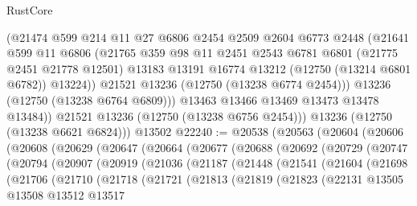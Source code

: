 \begin{lexlean}{RustCore}
\begin{coremodule}
              (@21474
                @599
                @214
                @11
                @27
                @6806
                @2454
                @2509
                @2604
                @6773
                @2448
                (@21641
                  @599
                  @11
                  @6806
                  (@21765
                    @359
                    @98
                    @11
                    @2451
                    @2543
                    @6781
                    @6801
                    (@21775 @2451 @21778 @12501)
                    @13183
                    @13191
                    @16774
                    @13212
                    (@12750 (@13214 @6801 @6782))
                    @13224))
                @21521
                @13236
                (@12750 (@13238 @6774 @2454)))
              @13236
              (@12750 (@13238 @6764 @6809)))
            @13463
            @13466
            @13469
            @13473
            @13478
            @13484))
        @21521
        @13236
        (@12750 (@13238 @6756 @2454)))
      @13236
      (@12750 (@13238 @6621 @6824)))
    @13502
@22240 := @20538
    (@20563
      (@20604
        (@20606
          (@20608
            (@20629
              (@20647
                (@20664
                  (@20677
                    (@20688
                      (@20692
                        (@20729
                          (@20747
                            (@20794
                              (@20907
                                (@20919
                                  (@21036
                                    (@21187
                                      (@21448
                                        (@21541
                                          (@21604
                                            (@21698
                                              (@21706
                                                (@21710
                                                  (@21718
                                                    (@21721
                                                      (@21813
                                                        (@21819
                                                          (@21823
                                                            (@22131
                                                              @13505
                                                              @13508
                                                              @13512
                                                              @13517

\end{coremodule}
\end{lexlean}
